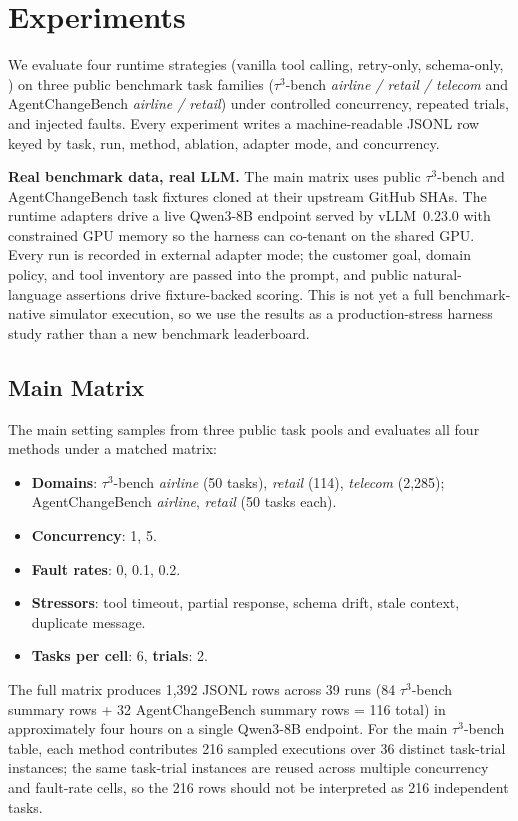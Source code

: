 \section{Experiments}
\label{sec:experiments}

We evaluate four runtime strategies (vanilla tool calling, retry-only, schema-only, \system) on three public benchmark task families (\mbox{$\tau^3$}-bench \textit{airline / retail / telecom} and AgentChangeBench \textit{airline / retail}) under controlled concurrency, repeated trials, and injected faults. Every experiment writes a machine-readable JSONL row keyed by task, run, method, ablation, adapter mode, and concurrency.

\textbf{Real benchmark data, real LLM.} The main matrix uses public \mbox{$\tau^3$}-bench and AgentChangeBench task fixtures cloned at their upstream GitHub SHAs. The runtime adapters drive a live Qwen3-8B endpoint served by vLLM~0.23.0 with constrained GPU memory so the harness can co-tenant on the shared GPU. Every run is recorded in external adapter mode; the customer goal, domain policy, and tool inventory are passed into the prompt, and public natural-language assertions drive fixture-backed scoring. This is not yet a full benchmark-native simulator execution, so we use the results as a production-stress harness study rather than a new benchmark leaderboard.

\subsection{Main Matrix}

The main setting samples from three public task pools and evaluates all four methods under a matched matrix:
\begin{itemize}
    \item \textbf{Domains}: \mbox{$\tau^3$}-bench \textit{airline} (50 tasks), \textit{retail} (114), \textit{telecom} (2{,}285); AgentChangeBench \textit{airline}, \textit{retail} (50 tasks each).
    \item \textbf{Concurrency}: 1, 5.
    \item \textbf{Fault rates}: 0, 0.1, 0.2.
    \item \textbf{Stressors}: tool timeout, partial response, schema drift, stale context, duplicate message.
    \item \textbf{Tasks per cell}: 6, \textbf{trials}: 2.
\end{itemize}
The full matrix produces 1{,}392 JSONL rows across 39 runs (84 \mbox{$\tau^3$}-bench summary rows + 32 AgentChangeBench summary rows = 116 total) in approximately four hours on a single Qwen3-8B endpoint. For the main \mbox{$\tau^3$}-bench table, each method contributes 216 sampled executions over 36 distinct task-trial instances; the same task-trial instances are reused across multiple concurrency and fault-rate cells, so the 216 rows should not be interpreted as 216 independent tasks.

